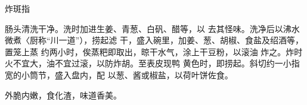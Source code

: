 \begin{recipe}{炸斑指}

\ingredients


\cooking

肠头清洗干净。洗时加进生姜、青葱、白矾、醋等，以 去其怪味。洗净后以沸水微煮〈厨称“川一道”），捞起滤 干，盛入碗里，加姜、葱、胡椒、食盐及绍酒等，置笼上蒸 约两小时，俟蒸粑即取出，晾干水气，涂上干豆粉，以滚油 炸之。炸时火不宜大，油不宜过滚，以防炸胡。至表皮现鸭 黄色时，即捞起。斜切约一小指宽的小筒节，盛入盘内，配 以葱、酱或椒盐，以荷叶饼佐食。

\notes

外脆内嫩，食化渣，味道香美。

\end{recipe}

